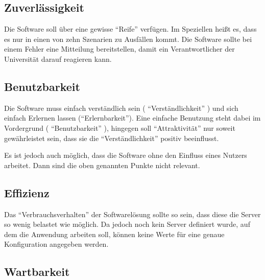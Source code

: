 \begin{flushleft}
\subsection{Zuverlässigkeit} %
\label{sub:Zuverlaessigkeit}

Die Software soll über eine gewisse ``Reife'' verfügen. 
Im Speziellen heißt es, dass es nur in einen von zehn Szenarien zu Ausfällen kommt.
Die Software sollte bei einem Fehler eine Mitteilung bereitstellen, damit ein Verantwortlicher der Universität darauf reagieren kann. 

\subsection{Benutzbarkeit} %
\label{sub:Benutzbarkeit}

Die Software muss einfach verständlich sein ( ``Verständlichkeit'' ) und sich einfach Erlernen lassen (``Erlernbarkeit'').
Eine einfache Benutzung steht dabei im Vordergrund ( ``Benutzbarkeit'' ), hingegen soll ``Attraktivität'' nur soweit gewährleistet sein,
dass sie die ``Verständlichkeit'' positiv beeinflusst. 

Es ist jedoch auch möglich, dass die Software ohne den Einfluss eines Nutzers arbeitet. Dann sind die oben genannten Punkte nicht relevant. 


\subsection{Effizienz} %
\label{sub:Effizienz}

Das ``Verbrauchsverhalten'' der Softwarelösung sollte so sein, dass diese die Server so wenig belastet wie möglich.
Da jedoch noch kein Server definiert wurde, auf dem die Anwendung arbeiten soll, können keine Werte für eine genaue Konfiguration
angegeben werden.

\subsection{Wartbarkeit} %
\label{sub:Wartbarkeit}


\end{flushleft}
